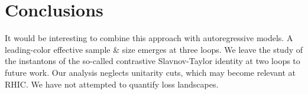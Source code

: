 \section{Conclusions}\label{sec:conclusions}

It would be interesting to combine this approach with autoregressive
models. A leading-color effective sample & size emerges at three loops. We
leave the study of the instantons of the so-called contrastive
Slavnov-Taylor identity at two loops to future work. Our analysis
neglects unitarity cuts, which may become relevant at RHIC. We have not
attempted to quantify loss landscapes.

